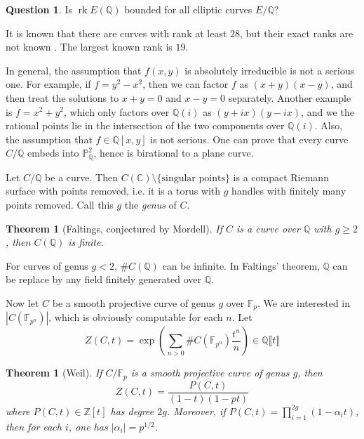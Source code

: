 \documentclass{article}
\newtheorem{theorem}[subsection]{Theorem}
\theoremstyle{definition}
\newtheorem{question}[subsection]{Question}
\begin{document}
\begin{question}
Is $\operatorname{rk} E(\mathbb{Q})$ bounded for all elliptic curves 
$E/\mathbb{Q}$?
\end{question}

It is known that there are curves with rank at least $28$, but their exact 
ranks are not known \cite{du}. The largest known rank is $19$. 

In general, the assumption that $f(x,y)$ is absolutely irreducible is not a 
serious one. For example, if $f=y^2-x^2$, then we can factor $f$ as 
$(x+y)(x-y)$, and then treat the solutions to $x+y=0$ and $x-y=0$ separately. 
Another example is $f=x^2+y^2$, which only factors over $\mathbb{Q}(i)$ as 
$(y+i x)(y-i x)$, and we the rational points lie in the intersection of the 
two components over $\mathbb{Q}(i)$. Also, the assumption that 
$f\in \mathbb{Q}[x,y]$ is not serious. One can prove that every curve 
$C/\mathbb{Q}$ embeds into $\mathbb{P}^2_\mathbb{Q}$, hence is birational to 
a plane curve. 

Let $C/\mathbb{Q}$ be a curve. Then 
$C(\mathbb{C})\setminus \{\text{singular points}\}$ is a compact Riemann 
surface with points removed, i.e. it is a torus with $g$ handles with finitely 
many points removed. Call this $g$ the \emph{genus} of $C$. 

\begin{theorem}[Faltings, conjectured by Mordell]
If $C$ is a curve over $\mathbb{Q}$ with $g\geqslant 2$, then $C(\mathbb{Q})$ 
is finite. 
\end{theorem}

For curves of genus $g<2$, $\# C(\mathbb{Q})$ can be infinite. In Faltings' 
theorem, $\mathbb{Q}$ can be replace by any field finitely generated over 
$\mathbb{Q}$. 

Now let $C$ be a smooth projective curve of genus $g$ over $\mathbb{F}_p$. 
We are interested in $|C(\mathbb{F}_{p^n})|$, which is obviously computable 
for each $n$. Let 
\[
  Z(C,t) = \exp\left( \sum_{n>0} \# C(\mathbb{F}_{p^n}) \frac{t^n}{n} \right) \in \mathbb{Q}\llbracket t\rrbracket 
\]

\begin{theorem}[Weil]
If $C/\mathbb{F}_p$ is a smooth projective curve of genus $g$, then 
\[
  Z(C,t) = \frac{P(C,t)}{(1-t)(1-p t)}
\]
where $P(C,t)\in \mathbb{Z}[t]$ has degree $2 g$. Moreover, if 
$P(C,t) = \prod_{i=1}^{2 g} (1-\alpha_i t)$, then for each $i$, one has 
$|\alpha_i|=p^{1/2}$. 
\end{theorem}
\end{document}

